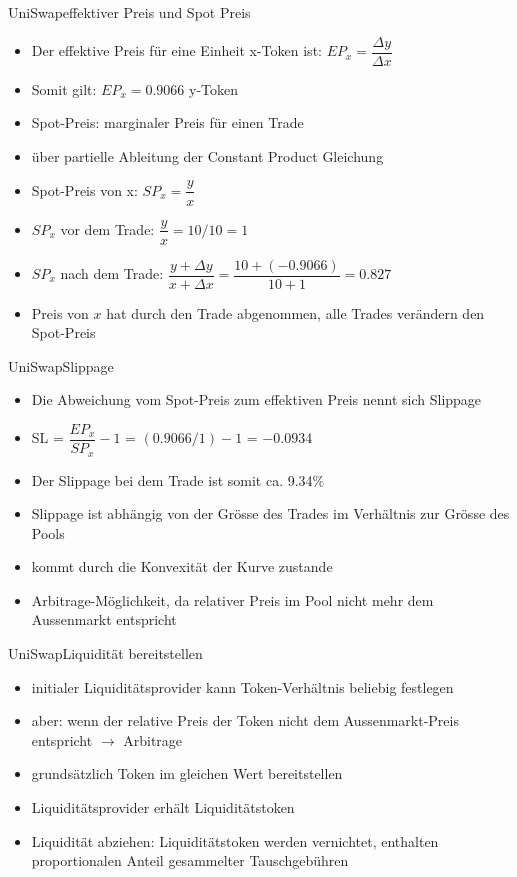 \documentclass{beamer}
\begin{document}
\begin{frame}{UniSwap}{effektiver Preis und Spot Preis}
\begin{itemize}
 \item<1->{Der effektive Preis für eine Einheit x-Token ist: $EP_{x} = \dfrac{\Delta y}{\Delta x}$}
 \item<2->{Somit gilt: $EP_{x}= 0.9066$ y-Token}
 \item<3->{Spot-Preis: marginaler Preis für einen Trade}
 \item<4->{über partielle Ableitung der Constant Product Gleichung}
 \item<5->{Spot-Preis von x: $SP_{x} = \dfrac{y}{x}$}
 \item<6->{$SP_{x}$ vor dem Trade:  $\dfrac{y}{x} = 10/10 = 1$}
 \item<7->{$SP_{x}$ nach dem Trade:  $\dfrac{y + \Delta y}{x + \Delta x} = \dfrac{10+(-0.9066)}{10+1} = 0.827$}
 \item<8->{Preis von $x$ hat durch den Trade abgenommen, alle Trades verändern den Spot-Preis}
\end{itemize}
\end{frame}

\begin{frame}{UniSwap}{Slippage}
\begin{itemize}
 \item<1->{Die Abweichung vom Spot-Preis zum effektiven Preis nennt sich Slippage}
 \item<2->{SL = $\dfrac{EP_{x}}{SP_{x}} - 1$ = $(0.9066 / 1) - 1$ = $ -0.0934 $}
 \item<3->{Der Slippage bei dem Trade ist somit ca. 9.34\%}
 \item<4->{Slippage ist abhängig von der Grösse des Trades im Verhältnis zur Grösse des Pools}
 \item<5->{kommt durch die Konvexität der Kurve zustande}
 \item<6->{Arbitrage-Möglichkeit, da relativer Preis im Pool nicht mehr dem Aussenmarkt entspricht}
\end{itemize}
\end{frame}

\begin{frame}{UniSwap}{Liquidität bereitstellen}
 \begin{itemize}
    \item<1->{initialer Liquiditätsprovider kann Token-Verhältnis beliebig festlegen}
    \item<2->{aber: wenn der relative Preis der Token nicht dem Aussenmarkt-Preis entspricht $\rightarrow$ Arbitrage}
    \item<3->{grundsätzlich Token im gleichen Wert bereitstellen}
    \item<4->{Liquiditätsprovider erhält Liquiditätstoken}
    \item<5->{Liquidität abziehen: Liquiditätstoken werden \glqq vernichtet\grqq , enthalten proportionalen Anteil gesammelter Tauschgebühren}
  \end{itemize}	
\end{frame}
\end{document}
